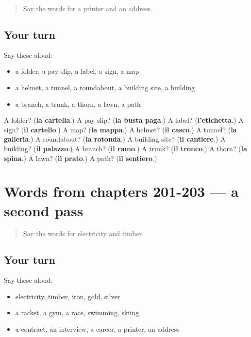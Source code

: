 \label{lesson:IT-R203-first-pass-words-from-chapters-198-200}



\begin{quote}
Say the words for a printer and an address.
\end{quote}

\subsection*{Your turn}
Say these aloud:

\begin{itemize}
\raggedright
  \item a folder, a pay slip, a label, a sign, a map
  \item a helmet, a tunnel, a roundabout, a building site, a building
  \item a branch, a trunk, a thorn, a lawn, a path
\end{itemize}

\begin{tcolorbox}[breakable,colback=teal!4,colframe=teal!35!black,title={Before you move on}]
A folder? (\textbf{la cartella}.) A pay slip? (\textbf{la busta paga}.) A label? (\textbf{l'etichetta}.) A sign? (\textbf{il cartello}.) A map? (\textbf{la mappa}.) A helmet? (\textbf{il casco}.) A tunnel? (\textbf{la galleria}.) A roundabout? (\textbf{la rotonda}.) A building site? (\textbf{il cantiere}.) A building? (\textbf{il palazzo}.) A branch? (\textbf{il ramo}.) A trunk? (\textbf{il tronco}.) A thorn? (\textbf{la spina}.) A lawn? (\textbf{il prato}.) A path? (\textbf{il sentiero}.)
\end{tcolorbox}
\section[(dialogue)]{Words from chapters 201-203 — a second pass}

\label{lesson:IT-R203-second-pass-words-from-chapters-201-203}



\begin{quote}
Say the words for electricity and timber.
\end{quote}

\subsection*{Your turn}
Say these aloud:

\begin{itemize}
\raggedright
  \item electricity, timber, iron, gold, silver
  \item a racket, a gym, a race, swimming, skiing
  \item a contract, an interview, a career, a printer, an address
\end{itemize}

